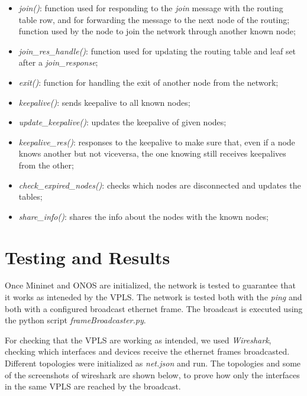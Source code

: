 \documentclass{article}
\begin{document}
\begin{itemize}
    \item \textit{join()}: function used for responding to the \textit{join} message with the routing table row, 
    and for forwarding the message to the next node of the routing; function used by the node to join the network through another known node;
    \item \textit{join\_res\_handle()}: function used for updating the routing table and leaf set after a \textit{join\_response};
    \item \textit{exit()}: function for handling the exit of another node from the network;
    \item \textit{keepalive()}: sends keepalive to all known nodes;
    \item \textit{update\_keepalive()}: updates the keepalive of given nodes;
    \item \textit{keepalive\_res()}: responses to the keepalive to make sure that, even if a node knows another but not viceversa, 
    the one knowing still receives keepalives from the other;
    \item \textit{check\_expired\_nodes()}: checks which nodes are disconnected and updates the tables;
    \item \textit{share\_info()}: shares the info about the nodes with the known nodes;
\end{itemize}

\section{Testing and Results}

Once Mininet and ONOS are initialized, the network is tested to guarantee 
that it works as inteneded by the VPLS. The network is tested both with the 
\textit{ping} and both with a configured broadcast ethernet frame. The 
broadcast is executed using the python script \textit{frameBroadcaster.py}.

For checking that the VPLS are working as intended, we used \textit{Wireshark},
 checking which interfaces and devices receive the ethernet frames broadcasted.
Different topologies were initialized as \textit{net.json} and run. 
The topologies and some of the screenshots of wireshark are shown below, 
to prove how only the interfaces in the same VPLS are reached by the broadcast.
\end{document}
